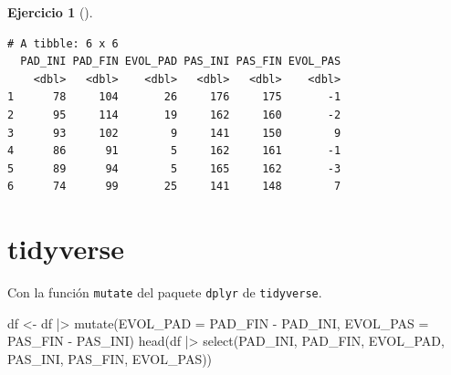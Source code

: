\documentclass[
  a4paper,
]{scrreport}
\newenvironment{Shaded}{\begin{snugshade}}{\end{snugshade}}
\newcommand{\AttributeTok}[1]{\textcolor[rgb]{0.40,0.45,0.13}{#1}}
\newcommand{\FunctionTok}[1]{\textcolor[rgb]{0.28,0.35,0.67}{#1}}
\newcommand{\NormalTok}[1]{\textcolor[rgb]{0.00,0.23,0.31}{#1}}
\newcommand{\OtherTok}[1]{\textcolor[rgb]{0.00,0.23,0.31}{#1}}
\newcommand{\SpecialCharTok}[1]{\textcolor[rgb]{0.37,0.37,0.37}{#1}}
\newcommand{\StringTok}[1]{\textcolor[rgb]{0.13,0.47,0.30}{#1}}
\theoremstyle{definition}
\newtheorem{exercise}{Ejercicio}[chapter]
\theoremstyle{remark}
\begin{document}
\begin{exercise}[]
\begin{enumerate}
\begin{tcolorbox}
\begin{Shaded}
\end{Shaded}

\begin{verbatim}
# A tibble: 6 x 6
  PAD_INI PAD_FIN EVOL_PAD PAS_INI PAS_FIN EVOL_PAS
    <dbl>   <dbl>    <dbl>   <dbl>   <dbl>    <dbl>
1      78     104       26     176     175       -1
2      95     114       19     162     160       -2
3      93     102        9     141     150        9
4      86      91        5     162     161       -1
5      89      94        5     165     162       -3
6      74      99       25     141     148        7
\end{verbatim}

  \section{tidyverse}

  Con la función \texttt{mutate} del paquete \texttt{dplyr} de
  \texttt{tidyverse}.

\begin{Shaded}
\begin{Highlighting}[]
\NormalTok{df }\OtherTok{\textless{}{-}}\NormalTok{ df }\SpecialCharTok{|\textgreater{}} \FunctionTok{mutate}\NormalTok{(}\AttributeTok{EVOL\_PAD =}\NormalTok{ PAD\_FIN }\SpecialCharTok{{-}}\NormalTok{ PAD\_INI, }\AttributeTok{EVOL\_PAS =}\NormalTok{ PAS\_FIN }\SpecialCharTok{{-}}\NormalTok{ PAS\_INI)}
\FunctionTok{head}\NormalTok{(df }\SpecialCharTok{|\textgreater{}} \FunctionTok{select}\NormalTok{(PAD\_INI, PAD\_FIN, EVOL\_PAD, PAS\_INI, PAS\_FIN, EVOL\_PAS))}
\end{Highlighting}
\end{Shaded}


\end{tcolorbox}
\end{enumerate}
\end{exercise}
\end{document}
